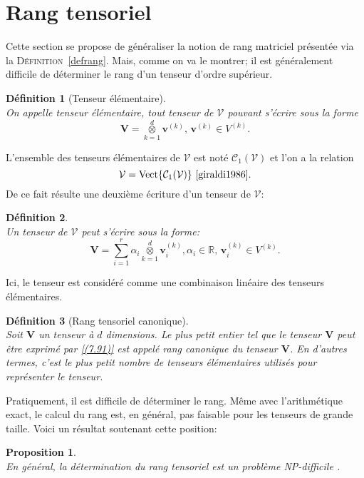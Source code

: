 \documentclass[11pt,a4paper,oneside]{book}
\newtheorem{prop}{Proposition}[chapter]
\newtheorem{defi}{Définition}[chapter]
\def\R{\mathbb R}
\def\cey{\mathcal C}
\def\V{\mathcal V}
\def\vey{\mathbf V}
\def\ktensor{\overset{d}{\underset{k=1}{\otimes}}}
\def\spam{\rm Vect}
\newcommand{\mbf}[1]{\mathbf{#1}}
\newcommand{\defref}[1]{\textsc{Définition}~\ref{#1}}
\begin{document}
	
\section{Rang tensoriel}\label{sec:2.3rang}
Cette section se propose de généraliser la notion de rang matriciel présentée via la  \defref{defrang}. Mais, comme on va le montrer; il est généralement difficile de déterminer le rang d'un tenseur d'ordre supérieur. 
\begin{defi}[Tenseur élémentaire]
	\emph{\\}
	On appelle tenseur élémentaire, tout tenseur de $\V$ pouvant
	s’écrire sous la forme $$\vey= \ktensor \mbf{v}^{(k)},\, \mbf{v}^{(k)}\in V^{(k)}.$$ 
\end{defi}
L’ensemble des tenseurs élémentaires
de $ \V $ est noté $ \cey_{1}(\V) $ et l'on a la relation 
\begin{equation*}
\V=\spam\{\cey_{1}(\V) \}\text{ \cite[p.20]{giraldi1986}}.
\end{equation*}De ce fait résulte une deuxième écriture d’un tenseur de $ \V  $:
\begin{defi}
	\emph{\\}
	Un tenseur de $ \V $ peut s’écrire sous la forme:
	\begin{equation}\label{(7.91)}
	\vey=\sum_{i=1}^{r}\alpha_{i}\ktensor \mbf{v}_{i}^{(k)},\alpha_{i}\in \R,\, \mbf{v}_{i}^{(k)}\in V^{(k)}.
	\end{equation}
\end{defi}
Ici, le tenseur est considéré comme une combinaison linéaire des tenseurs élémentaires.
\begin{defi}[Rang tensoriel canonique]
	\emph{\\}	
	Soit $\mathbf{V}$ un tenseur à $ d $ dimensions. Le plus petit entier tel que le tenseur $\mathbf{V}$ peut être exprimé par \eqref{(7.91)} est appelé rang canonique du tenseur $\mathbf{V}$. En d'autres termes, c'est le plus petit nombre de tenseurs élémentaires utilisés pour représenter le tenseur.
\end{defi}
Pratiquement, il est difficile de déterminer le rang. Même avec l'arithmétique exact, le calcul du rang est, en général, pas faisable pour les tenseurs de grande taille. Voici un résultat soutenant cette position:
\begin{prop}\label{proprank}
	\emph{\\}
	En général, la détermination du rang tensoriel est un problème NP-difficile \cite[p.2]{haastad1990tensor}.
\end{prop}
\end{document}
